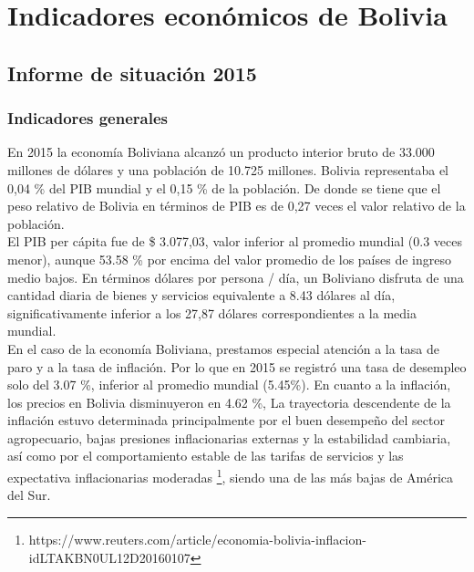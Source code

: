 

\chapter{Indicadores económicos de Bolivia}

\section{Informe de situación 2015}

    \subsection{Indicadores generales}
    En 2015 la economía Boliviana alcanzó un producto interior bruto de 33.000 millones de dólares y una población de 10.725 millones. Bolivia representaba el 0,04 \% del PIB mundial y el 0,15 \%  de la población. De donde se tiene que el peso relativo de Bolivia en términos de PIB es de 0,27 veces el valor relativo de la población.\\
    El PIB per cápita fue de \$ 3.077,03, valor inferior al promedio mundial (0.3 veces menor), aunque 53.58 \% por encima del valor promedio de los países de ingreso medio bajos. En términos dólares por persona / día, un Boliviano disfruta de una cantidad diaria de bienes y servicios equivalente a 8.43 dólares al día, significativamente inferior a los 27,87 dólares correspondientes a la media mundial.\\
    En el caso de la economía Boliviana, prestamos especial atención a la tasa de paro y a la tasa de inflación. Por lo que en 2015 se registró una tasa de desempleo solo del 3.07 \%, inferior al promedio mundial (5.45\%). En cuanto a la inflación, los precios en Bolivia disminuyeron en 4.62 \%, La trayectoria descendente de la inflación estuvo determinada principalmente por el buen desempeño del sector agropecuario, bajas presiones inflacionarias externas y la estabilidad cambiaria, así como por el comportamiento estable de las tarifas de servicios y las expectativa inflacionarias moderadas \footnote{https://www.reuters.com/article/economia-bolivia-inflacion-idLTAKBN0UL12D20160107}, siendo una de las más bajas de América del Sur. \\


